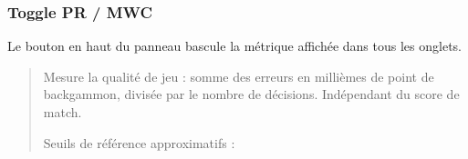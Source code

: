 \documentclass[letterpaper,10pt,french]{sphinxmanual}
\begin{document}
\subsubsection{Toggle PR / MWC}
\label{\detokenize{manuel:toggle-pr-mwc}}
\sphinxAtStartPar
Le bouton  en haut du panneau bascule la métrique affichée dans
tous les onglets.

\sphinxAtStartPar
{}
\begin{quote}

\sphinxAtStartPar
Mesure la qualité de jeu  : somme des erreurs en millièmes de
point de backgammon, divisée par le nombre de décisions. Indépendant du
score de match.

\sphinxAtStartPar
Seuils de référence approximatifs :



\end{quote}
\end{document}
